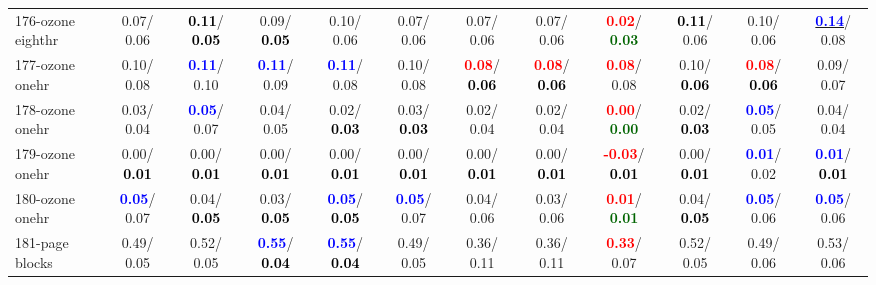 \begin{table}[h]
\begin{center}
{\begin{tabular}{lc|c|c|c|c|c|c|c|c|c|c}
176-ozone eighthr &   0.07/  0.06 & \textcolor{black}{\textbf{  0.11}}/\textcolor{black}{\textbf{  0.05}} &   0.09/\textcolor{black}{\textbf{  0.05}} &   0.10/  0.06 &   0.07/  0.06 &   0.07/  0.06 &   0.07/  0.06 & \textcolor{red}{\textbf{  0.02}}/\textcolor{darkgreen}{\textbf{  0.03}} & \textcolor{black}{\textbf{  0.11}}/  0.06 &   0.10/  0.06 & \underline{\textcolor{blue}{\textbf{  0.14}}}/  0.08 \\
177-ozone onehr &   0.10/  0.08 & \textcolor{blue}{\textbf{  0.11}}/  0.10 & \textcolor{blue}{\textbf{  0.11}}/  0.09 & \textcolor{blue}{\textbf{  0.11}}/  0.08 &   0.10/  0.08 & \textcolor{red}{\textbf{  0.08}}/\textcolor{black}{\textbf{  0.06}} & \textcolor{red}{\textbf{  0.08}}/\textcolor{black}{\textbf{  0.06}} & \textcolor{red}{\textbf{  0.08}}/  0.08 &   0.10/\textcolor{black}{\textbf{  0.06}} & \textcolor{red}{\textbf{  0.08}}/\textcolor{black}{\textbf{  0.06}} &   0.09/  0.07 \\
178-ozone onehr &   0.03/  0.04 & \textcolor{blue}{\textbf{  0.05}}/  0.07 &   0.04/  0.05 &   0.02/\textcolor{black}{\textbf{  0.03}} &   0.03/\textcolor{black}{\textbf{  0.03}} &   0.02/  0.04 &   0.02/  0.04 & \textcolor{red}{\textbf{  0.00}}/\textcolor{darkgreen}{\textbf{  0.00}} &   0.02/\textcolor{black}{\textbf{  0.03}} & \textcolor{blue}{\textbf{  0.05}}/  0.05 &   0.04/  0.04 \\
179-ozone onehr &   0.00/\textcolor{black}{\textbf{  0.01}} &   0.00/\textcolor{black}{\textbf{  0.01}} &   0.00/\textcolor{black}{\textbf{  0.01}} &   0.00/\textcolor{black}{\textbf{  0.01}} &   0.00/\textcolor{black}{\textbf{  0.01}} &   0.00/\textcolor{black}{\textbf{  0.01}} &   0.00/\textcolor{black}{\textbf{  0.01}} & \textcolor{red}{\textbf{ -0.03}}/\textcolor{black}{\textbf{  0.01}} &   0.00/\textcolor{black}{\textbf{  0.01}} & \textcolor{blue}{\textbf{  0.01}}/  0.02 & \textcolor{blue}{\textbf{  0.01}}/\textcolor{black}{\textbf{  0.01}} \\
180-ozone onehr & \textcolor{blue}{\textbf{  0.05}}/  0.07 &   0.04/\textcolor{black}{\textbf{  0.05}} &   0.03/\textcolor{black}{\textbf{  0.05}} & \textcolor{blue}{\textbf{  0.05}}/\textcolor{black}{\textbf{  0.05}} & \textcolor{blue}{\textbf{  0.05}}/  0.07 &   0.04/  0.06 &   0.03/  0.06 & \textcolor{red}{\textbf{  0.01}}/\textcolor{darkgreen}{\textbf{  0.01}} &   0.04/\textcolor{black}{\textbf{  0.05}} & \textcolor{blue}{\textbf{  0.05}}/  0.06 & \textcolor{blue}{\textbf{  0.05}}/  0.06 \\
181-page blocks &   0.49/  0.05 &   0.52/  0.05 & \textcolor{blue}{\textbf{  0.55}}/\textcolor{black}{\textbf{  0.04}} & \textcolor{blue}{\textbf{  0.55}}/\textcolor{black}{\textbf{  0.04}} &   0.49/  0.05 &   0.36/  0.11 &   0.36/  0.11 & \textcolor{red}{\textbf{  0.33}}/  0.07 &   0.52/  0.05 &   0.49/  0.06 &   0.53/  0.06 \\ \hline

\end{tabular}}
\end{center}
\end{table}
